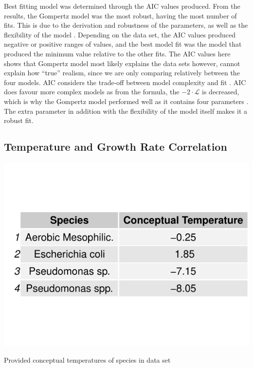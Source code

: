 \documentclass[11pt]{article}
\begin{document}
Best fitting model was determined through the AIC values produced. From the results, the Gompertz model was the most robust, having the most number of fits. This is due to the derivation and robustness of the parameters, as well as the flexibility of the model \cite{tjorve2017use}. Depending on the data set, the AIC values produced negative or positive ranges of values, and the best model fit was the model that produced the minimum value relative to the other fits. The AIC values here shows that Gompertz model most likely explains the data sets however, cannot explain how “true” realism, since we are only comparing relatively between the four models. AIC considers the trade-off between model complexity and fit \cite{vrieze2012model}. AIC does favour more complex models as from the formula, the $-2 \cdot \mathcal{L}$ is decreased, which is why the Gompertz model performed well as it contains four parameters \cite{posada2004model}. The extra parameter in addition with the flexibility of the model itself makes it a robust fit.

\subsection{Temperature and Growth Rate Correlation}
\begin{table}[h!]
\centering
\includegraphics[scale=0.60]{../Results/Species_ConceptualTemp.pdf} \caption{Provided conceptual temperatures of species in data set} \label{tab:Conceptual Temperature}
\end{table}
\end{document}
